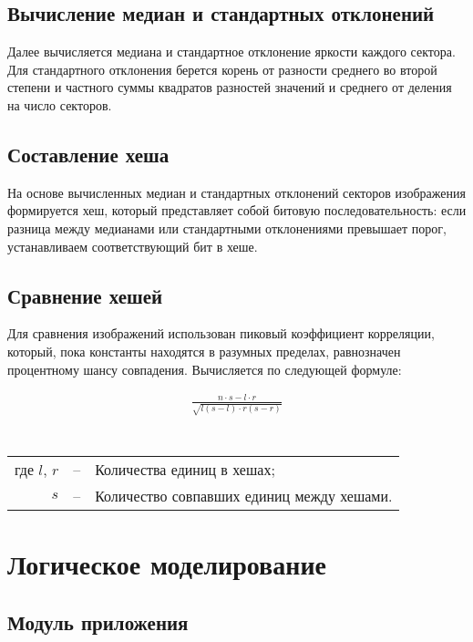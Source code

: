 \subsection{Вычисление медиан и стандартных отклонений}

Далее вычисляется медиана и стандартное отклонение яркости каждого сектора. Для
стандартного отклонения берется корень от разности среднего во второй степени и
частного суммы квадратов разностей значений и среднего от деления на число
секторов.

\subsection{Составление хеша}

На основе вычисленных медиан и стандартных отклонений секторов изображения
формируется хеш, который представляет собой битовую последовательность: если
разница между медианами или стандартными отклонениями превышает порог,
устанавливаем соответствующий бит в хеше.

\subsection{Сравнение хешей}

Для сравнения изображений использован пиковый коэффициент корреляции, который,
пока константы находятся в разумных пределах, равнозначен процентному шансу
совпадения. Вычисляется по следующей формуле:

\[\begin{array}{c}
            \frac{n\cdot{}s-l\cdot{}r}{\sqrt{l(s-l)\cdot{}r(s-r)}} \\
      \end{array}\]\\
\begin{tabular}{r c l}
      где $l$, $r$ & -- & Количества единиц в хешах;                \\
      $s$          & -- & Количество совпавших единиц между хешами. \\
\end{tabular}

\section{Логическое моделирование}

\subsection*{Модуль приложения}


